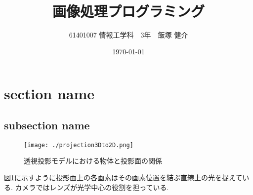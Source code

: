 \documentclass[11pt,a4j]{jsarticle}
\title{画像処理プログラミング}
\author{61401007 情報工学科　3年　飯塚 健介}
\date{\today}
\begin{document}
    \maketitle
    \section{section name}
    \subsection{subsection name}


    \begin{figure}[H]
      \centering
      \texttt{[image: ./projection3Dto2D.png]}
      \caption{透視投影モデルにおける物体と投影面の関係\label{fig:model}}
    \end{figure}
    図\ref{fig:model}に示すように投影面上の各画素はその画素位置を結ぶ直線上の光を捉えている.
    カメラではレンズが光学中心の役割を担っている.
\end{document}
